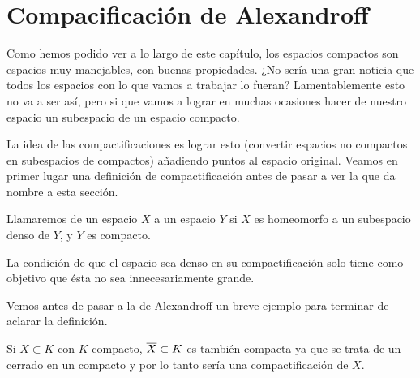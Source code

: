 \section{Compacificación de Alexandroff}

Como hemos podido ver a lo largo de este capítulo, los espacios compactos son espacios muy manejables, con buenas propiedades. ¿No sería una gran noticia que todos los espacios con lo que vamos a trabajar lo fueran? Lamentablemente esto no va a ser así, pero si que vamos a lograr en muchas ocasiones hacer de nuestro espacio un subespacio de un espacio compacto.


La idea de las compactificaciones es lograr esto (convertir espacios no compactos en subespacios de compactos) añadiendo puntos al espacio original.
Veamos en primer lugar una definición de compactificación antes de pasar a ver la que da nombre a esta sección.

\begin{defi}[Compactificación]
Llamaremos  de un espacio $X$ a un espacio $Y$ si $X$ es homeomorfo a un subespacio denso de $Y$, y $Y$ es compacto.
\end{defi}


La condición de que el espacio sea denso en su compactificación solo tiene como objetivo que ésta no sea innecesariamente grande. 


Vemos antes de pasar a la de Alexandroff un breve ejemplo para terminar de aclarar la definición.
\begin{exa}
	Si $X\subset K$ con $K$ compacto, $\overline{X}\subset K$ es también compacta ya que se trata de un cerrado en un compacto y por lo tanto sería una compactificación de $X$.
\end{exa}

